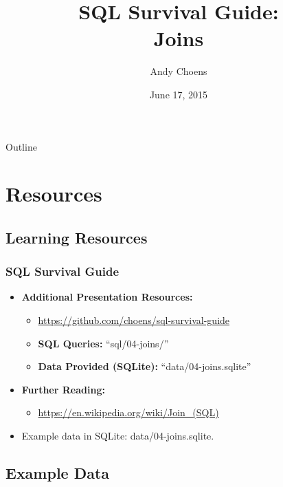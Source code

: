 \documentclass{beamer}
\title[SQL Survival Guide]{SQL Survival Guide:\\Joins}
\author{Andy Choens}
\institute{EBCoP}
\date{June 17, 2015}
\begin{document}
\begin{frame} %
  \titlepage
\end{frame}

\begin{frame}{Outline} %
  \tableofcontents
\end{frame}




\section{Resources} %

\subsection{Learning Resources} %

\begin{frame} %
  \frametitle{SQL Survival Guide}

  \begin{itemize}
  \item \textbf{Additional Presentation Resources:}
    \begin{itemize}
    \item \url{https://github.com/choens/sql-survival-guide}
    \item \textbf{SQL Queries:} ``sql/04-joins/''
    \item \textbf{Data Provided (SQLite):} ``data/04-joins.sqlite''
    \end{itemize}
  \item \textbf{Further Reading:}
    \begin{itemize}
    \item \url{https://en.wikipedia.org/wiki/Join\_(SQL)}
    \end{itemize}
  \item Example data in SQLite: data/04-joins.sqlite.
  \end{itemize}
  
\end{frame}

\subsection{Example Data} %
\end{document}
